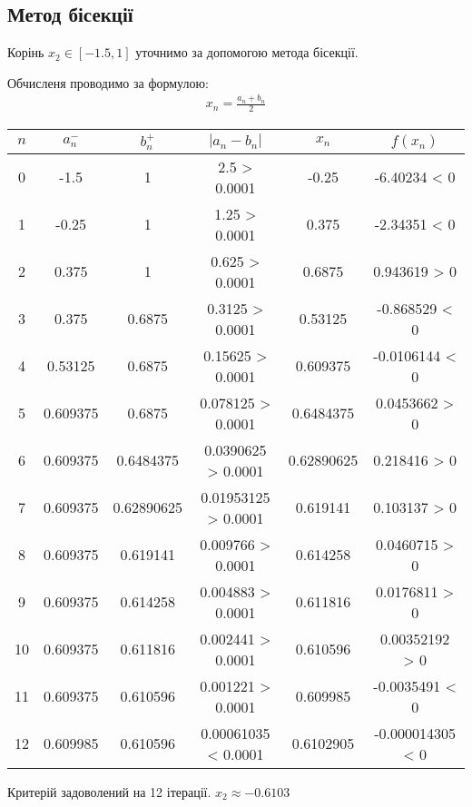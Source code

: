 \subsection{Метод бісекції}
\label{subsec:task1_bisect}

Корінь $x_2 \in [-1.5, 1]$ уточнимо
за допомогою метода бісекції.

Обчисленя проводимо за формулою:
\begin{align}
    x_n = \frac{a_n + b_n}{2}
\end{align}

\begin{tabular}{|c|c|c|c|c|c|}
    \toprule
    $n$ & $a_n^-$  & $b_n^+$    & $|a_n - b_n|$       & $x_n$      & $f(x_n)$         \\

    \midrule
    0   & -1.5     & 1          & 2.5        > 0.0001 & -0.25      & -6.40234     < 0 \\
    1   & -0.25    & 1          & 1.25       > 0.0001 & 0.375      & -2.34351     < 0 \\
    2   & 0.375    & 1          & 0.625      > 0.0001 & 0.6875     & 0.943619     > 0 \\
    3   & 0.375    & 0.6875     & 0.3125     > 0.0001 & 0.53125    & -0.868529    < 0 \\
    4   & 0.53125  & 0.6875     & 0.15625    > 0.0001 & 0.609375   & -0.0106144   < 0 \\
    5   & 0.609375 & 0.6875     & 0.078125   > 0.0001 & 0.6484375  & 0.0453662    > 0 \\
    6   & 0.609375 & 0.6484375  & 0.0390625  > 0.0001 & 0.62890625 & 0.218416     > 0 \\
    7   & 0.609375 & 0.62890625 & 0.01953125 > 0.0001 & 0.619141   & 0.103137     > 0 \\
    8   & 0.609375 & 0.619141   & 0.009766   > 0.0001 & 0.614258   & 0.0460715    > 0 \\
    9   & 0.609375 & 0.614258   & 0.004883   > 0.0001 & 0.611816   & 0.0176811    > 0 \\
    10  & 0.609375 & 0.611816   & 0.002441   > 0.0001 & 0.610596   & 0.00352192   > 0 \\
    11  & 0.609375 & 0.610596   & 0.001221   > 0.0001 & 0.609985   & -0.0035491   < 0 \\
    12  & 0.609985 & 0.610596   & 0.00061035 < 0.0001 & 0.6102905  & -0.000014305 < 0 \\

    \bottomrule
\end{tabular}

Критерій задоволений на 12 ітерації. $x_2 \approx -0.6103$
